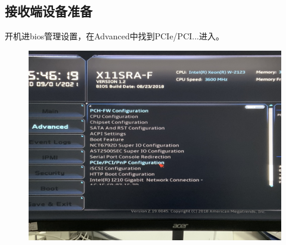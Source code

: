 \documentclass[openbib]{article}
\begin{document}
\subsection{接收端设备准备}
开机进bios管理设置，在Advanced中找到PCIe/PCI...进入。
\begin{figure}[H]
	\centering
	\includegraphics[scale=0.05]{57}
\end{figure}
\end{document}

